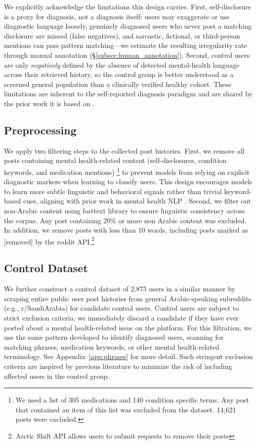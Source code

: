 \documentclass[11pt]{article}
\begin{document}
We explicitly acknowledge the limitations this design carries. First,
self-disclosure is a proxy for diagnosis, not a diagnosis itself: users
may exaggerate or use diagnostic language loosely, genuinely diagnosed
users who never post a matching disclosure are missed (false
negatives), and sarcastic, fictional, or third-person mentions can pass
pattern matching---we estimate the resulting irregularity rate through
manual annotation (\S\ref{subsec:human_annotation}). Second, control
users are only \textit{negatively} defined by the absence of detected
mental-health language across their retrieved history, so the control
group is better understood as a screened general population than a
clinically verified healthy cohort. These limitations are inherent to
the self-reported diagnosis paradigm and are shared by the prior work
it is based on \citep{coppersmith2014quantifying, cohan-etal-2018-smhd}.

\subsection{Preprocessing}

We apply two filtering steps to the collected post histories. First, we remove all posts containing mental health-related content (self-disclosures, condition keywords, and medication mentions) \footnote{We used a list of 305 medications and 140 condition specific terms. Any post that contained an item of this list was excluded from the dataset. 14,621 posts were excluded.} to prevent models from relying on explicit diagnostic markers when learning to classify users. This design encourages models to learn more subtle linguistic and behavioral signals rather than trivial keyword-based cues, aligning with prior work in mental health NLP \cite{cohan-etal-2018-smhd}. Second, we filter out non-Arabic content using fasttext library to ensure linguistic consistency across the corpus. Any post containing 20\% or more non Arabic content was excluded. In addition, we remove posts with less than 10 words, including posts marked as [removed] by the reddit API.\footnote{Arctic Shift API allows users to submit requests to remove their posts}

\subsection{Control Dataset}
We further construct a control dataset of 2,875 users in a similar manner by scraping entire public user post histories from general Arabic-speaking subreddits (e.g., r/SaudiArabia) for candidate control users. Control users are subject to strict exclusion criteria: we immediately discard a candidate if they have ever posted about a mental health-related issue on the platform. For this filtration, we use the same pattern developed to identify diagnosed users, scanning for matching phrases, medication keywords, or other mental health-related terminology. See Appendix~\ref{app:phrases} for more detail. Such stringent exclusion criteria are inspired by previous literature \cite{cohan-etal-2018-smhd} to minimize the risk of including affected users in the control group.
\end{document}
